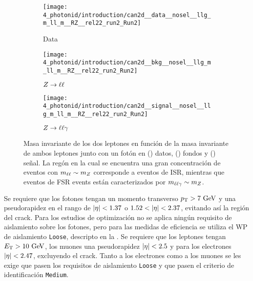 \begin{figure}[ht!]
    \centering
    \begin{subfigure}[h]{0.32\linewidth}
        \centering
        \texttt{[image: 4\_photonid/introduction/can2d\_\_data\_\_nosel\_\_llg\_m\_ll\_m\_\_RZ\_\_rel22\_run2\_Run2]}
        \caption{Data}
        \label{fig:pid_ss:event_selection:mll_mlly_distribution:data}
    \end{subfigure}
    \hfill
    \begin{subfigure}[h]{0.32\linewidth}
        \centering
        \texttt{[image: 4\_photonid/introduction/can2d\_\_bkg\_\_nosel\_\_llg\_m\_ll\_m\_\_RZ\_\_rel22\_run2\_Run2]}
        \caption{\(Z\rightarrow \ell\ell\)}
        \label{fig:pid_ss:event_selection:mll_mlly_distribution:bkg}
    \end{subfigure}
    \hfill
    \begin{subfigure}[h]{0.32\linewidth}
        \centering
        \texttt{[image: 4\_photonid/introduction/can2d\_\_signal\_\_nosel\_\_llg\_m\_ll\_m\_\_RZ\_\_rel22\_run2\_Run2]}
        \caption{\(Z\rightarrow \ell\ell\gamma\)}
        \label{fig:pid_ss:event_selection:mll_mlly_distribution:signal}
    \end{subfigure}
    \caption{Masa invariante de los dos leptones en función de la masa invariante de ambos leptones junto con un fotón en () datos, () fondos y () se\~nal. La regón en la cual se encuentra una gran concentración de eventos con \(m_{\ell\ell} \sim m_{Z}\) corresponde a eventos de \ac{ISR}, mientras que eventos de \ac{FSR} events están caracterizados por \(m_{\ell\ell\gamma} \sim m_{Z}\).}
    \label{fig:pid_ss:event_selection:mll_mlly_distribution}
\end{figure}

Se requiere que los fotones tengan un momento transverso \(p_{\text{T}}>7~\text{GeV}\) y una pseudorapidez en el rango de \(|\eta|<1.37\) o \(1.52<\abseta<2.37\), evitando así la región del crack.
Para los estudios de optimización no se aplica ningún requisito de aislamiento sobre los fotones, pero para las medidas de eficiencia se utiliza el \ac{WP} de aislamiento \texttt{Loose}, descripto en la \Sect{\ref{subsec:objects:egamma:iso}}. Se requiere que los leptones tengan \(E_{\text{T}}>10~\text{GeV}\), los muones una pseudorapidez \(|\eta|<2.5\) y para los electrones \(|\eta|<2.47\), excluyendo el crack. Tanto a los electrones como a los muones se les exige que pasen los requisitos de aislamiento \texttt{Loose} y que pasen el criterio de identificación \texttt{Medium}.

